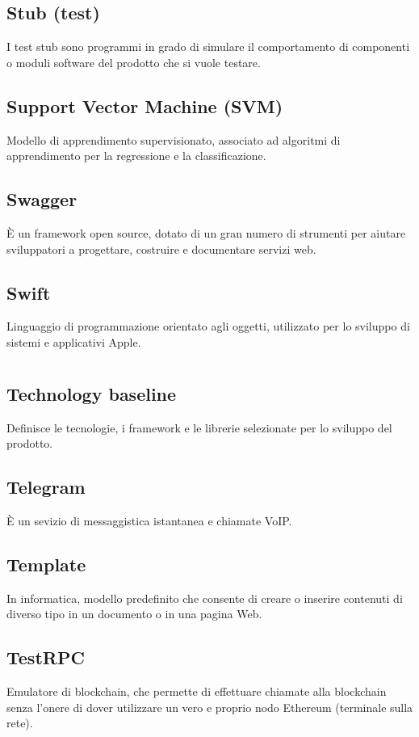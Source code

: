 	\subsection*{Stub (test)}
	I test stub sono programmi in grado di simulare il comportamento di componenti o moduli software del prodotto che si vuole testare.
	\subsection*{Support Vector Machine (SVM)}
	Modello di apprendimento supervisionato, associato ad algoritmi di apprendimento per la regressione e la classificazione.
	\subsection*{Swagger}
	È un framework open source, dotato di un gran numero di strumenti per aiutare sviluppatori a progettare, costruire e documentare servizi web.
	\subsection*{Swift}
	Linguaggio di programmazione orientato agli oggetti, utilizzato per lo sviluppo di sistemi e applicativi Apple.
\pagebreak
\section[T]{}
	\subsection*{Technology baseline}
	Definisce le tecnologie, i framework e le librerie selezionate per lo sviluppo del prodotto.
	\subsection*{Telegram}
	È un sevizio di messaggistica istantanea e chiamate VoIP.
	\subsection*{Template}
	In informatica, modello predefinito che consente di creare o inserire contenuti di diverso tipo in un documento o in una pagina Web.
	\subsection*{TestRPC}
	Emulatore di blockchain, che permette di effettuare chiamate alla blockchain senza l'onere di dover utilizzare un vero e proprio nodo Ethereum (terminale sulla rete).

